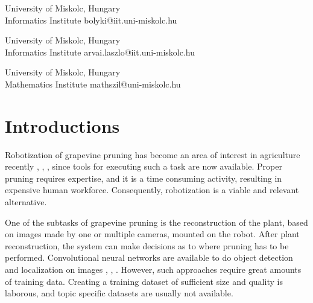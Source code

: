 \documentclass{PSAIE}%
\begin{document}
%
%
%


\fancyfoot{}

\noindent{} %

\noindent{}
{University of Miskolc, Hungary\\[0pt] Informatics Institute}
{bolyki@iit.uni-miskolc.hu}

\noindent{}
{University of Miskolc, Hungary\\[0pt] Informatics Institute}
{arvai.laszlo@iit.uni-miskolc.hu}

\noindent{}
{University of Miskolc, Hungary\\[0pt] Mathematics Institute}
{mathszil@uni-miskolc.hu}

\noindent\PSAIEreceived{\today}

\noindent{}

\noindent{}


\section{Introductions}
Robotization of grapevine pruning has become an area of interest in agriculture recently
\cite{botterill2017robot}, \cite{fernandes2021grapevine}, \cite{katyara2020reproducible}, since
tools for executing such a task are now available. Proper pruning requires expertise, and it is
a time consuming activity, resulting in expensive human workforce. Consequently, robotization is
a viable and relevant alternative.

One of the subtasks of grapevine pruning is the reconstruction of the plant, based on images made by
one or multiple cameras, mounted on the robot. After plant reconstruction, the system can make decisions
as to where pruning has to be performed. Convolutional neural networks are available to do
object detection and localization on images \cite{glenn_jocher_2021_5563715}, \cite{matterport_maskrcnn_2017},
\cite{liu2016ssd}. However, such approaches require great amounts of training data. Creating a training
dataset of sufficient size and quality is laborous, and topic specific datasets are usually not available.
\end{document}
